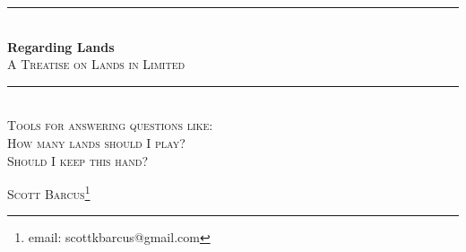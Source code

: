 \documentclass[oneside]{book}   %
\begin{document}
 
\frontmatter

\begin{titlepage} %
	\newcommand{\HRule}{\rule{\linewidth}{0.5mm}} %
	
	\center %
	

	
	\HRule\\[0.4cm]
	
	{\huge\bfseries Regarding Lands}\\[0.4cm] %
	\textsc{\Large A Treatise on Lands in Limited}
	\HRule\\[1.5cm]
	
	
	\textsc{\LARGE Tools for answering questions like:}\\[1.cm] %
	
	\textsc{\Large How many lands should I play?}\\[0.5cm] %
	
	\textsc{\Large Should I keep this hand?}\\[1.5cm] %
	
	\begin{minipage}{0.5\textwidth}
		\begin{center}
			\large
			\textsc{Scott Barcus}\footnote{email: scottkbarcus@gmail.com} \newline
		\end{center}
	\end{minipage}
	
	
	
	

\end{titlepage}
\end{document}
